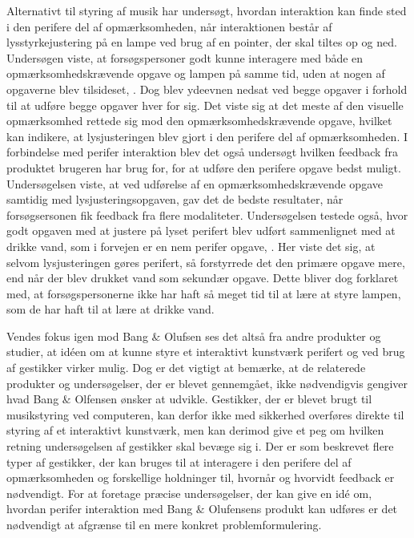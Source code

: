 Alternativt til styring af musik har \textcite[s. 1]{PDF:FacilitatingPIDesignAndEvaluation} undersøgt, hvordan interaktion kan finde sted i den perifere del af opmærksomheden, når interaktionen består af lysstyrkejustering på en lampe ved brug af en pointer, der skal tiltes op og ned. Undersøgen viste, at forsøgspersoner godt kunne interagere med både en opmærksomhedskrævende opgave og lampen på samme tid, uden at nogen af opgaverne blev tilsideset, \parencite[ss. 20-21]{PDF:FacilitatingPIDesignAndEvaluation}. Dog blev ydeevnen nedsat ved begge opgaver i forhold til at udføre begge opgaver hver for sig. Det viste sig at det meste af den visuelle opmærksomhed rettede sig mod den opmærksomhedskrævende opgave, hvilket kan indikere, at lysjusteringen blev gjort i den perifere del af opmærksomheden. I forbindelse med perifer interaktion blev det også undersøgt hvilken feedback fra produktet brugeren har brug for, for at udføre den perifere opgave bedst muligt. Undersøgelsen viste, at ved udførelse af en opmærksomhedskrævende opgave samtidig med lysjusteringsopgaven, gav det de bedste resultater, når forsøgsersonen fik feedback fra flere modaliteter.  Undersøgelsen testede også, hvor godt opgaven med at justere på lyset perifert blev udført sammenlignet med at drikke vand, som i forvejen er en nem perifer opgave, \parencite[s. 20]{PDF:FacilitatingPIDesignAndEvaluation}. Her viste det sig, at selvom lysjusteringen gøres perifert, så forstyrrede det den primære opgave mere, end når der blev drukket vand som sekundær opgave. Dette bliver dog forklaret med, at forsøgspersonerne ikke har haft så meget tid til at lære at styre lampen, som de har haft til at lære at drikke vand. 

Vendes fokus igen mod Bang $\&$ Olufsen ses det altså fra andre produkter og studier, at idéen om at kunne styre et interaktivt kunstværk perifert og ved brug af gestikker virker mulig. Dog er det vigtigt at bemærke, at de relaterede produkter og undersøgelser, der er blevet gennemgået, ikke nødvendigvis gengiver hvad Bang $\&$ Olfensen ønsker at udvikle. Gestikker, der er blevet brugt til musikstyring ved computeren, kan derfor ikke med sikkerhed overføres direkte til styring af et interaktivt kunstværk, men kan derimod give et peg om hvilken retning undersøgelsen af gestikker skal bevæge sig i. Der er som beskrevet flere typer af gestikker, der kan bruges til at interagere i den perifere del af opmærksomheden og forskellige holdninger til, hvornår og hvorvidt feedback er nødvendigt. For at foretage præcise undersøgelser, der kan give en idé om, hvordan perifer interaktion med Bang $\&$ Olufensens produkt kan udføres er det nødvendigt at afgrænse til en mere konkret problemformulering.




